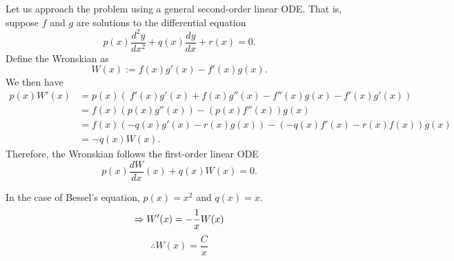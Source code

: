 \item

Let us approach the problem using a general second-order linear ODE.
That is, suppose $f$ and $g$ are solutions to the differential equation
\[
    p(x) \frac{d^2 y}{dx^2} + q(x) \frac{dy}{dx} + r(x) = 0.
\]
Define the Wronskian as
\[
    W(x) := f(x) g'(x) - f'(x) g(x).
\]
We then have
\begin{align*}
    p(x) W'(x)
    &= p(x) \left(\
        f'(x) g'(x) + f(x) g''(x) - f''(x) g(x) - f'(x) g'(x)
    \right)\\
    &= f(x) \left( p(x) g''(x) \right)
     - \left( p(x) f''(x) \right) g(x) \\
    &= f(x) \left( -q(x) g'(x) - r(x) g(x) \right)
     - \left( -q(x) f'(x) - r(x) f(x) \right) g(x) \\
    &= -q(x) W(x).
\end{align*}
Therefore, the Wronskian follows the first-order linear ODE
\[
    p(x) \frac{dW}{dx}(x) + q(x) W(x) = 0.
\]

In the case of Bessel's equation, $p(x) = x^2$ and $q(x) = x$.
\[
    \Rightarrow W'(x) = -\frac{1}{x} W(x)
\]
\[
    \therefore W(x) = \frac{C}{x}
\]

